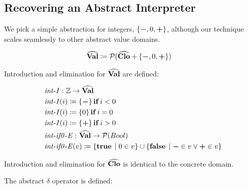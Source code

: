 \subsection{Recovering an Abstract
Interpreter}\label{recovering-an-abstract-interpreter}

\par

We pick a simple abstraction for integers,
$ \{  \mathbin{\mathtt{\mathbf{\boldsymbol{-}}}} ,0, \mathbin{\mathtt{\mathbf{\boldsymbol{+}}}}  \} $, although our technique
scales seamlessly to other abstract value domains.

\small\begin{align*}
&\hspace{0em}  \widehat{\mathtt{\mathbf{Val}}}   \coloneqq   \mathcal{P}  (\widehat{\mathtt{\mathbf{Clo}}}  +  \{  \mathbin{\mathtt{\mathbf{\boldsymbol{-}}}} ,0, \mathbin{\mathtt{\mathbf{\boldsymbol{+}}}}  \} )
\end{align*}\normalsize

Introduction and elimination for $ \widehat{\mathtt{\mathbf{Val}}} $ are defined:

\small\begin{align*}
&\hspace{0em}  \operatorname{\mathit{int-I}}   \mathbin{\colon}   \mathbb{Z}   \rightarrow   \widehat{\mathtt{\mathbf{Val}}}  \\
&\hspace{0em}  \operatorname{\mathit{int-I}}( i)  \coloneqq   \{  \mathbin{\mathtt{\mathbf{\boldsymbol{-}}}}  \}   \operatorname{\mathtt{\boldsymbol{\mathbf{if}}}}  i < 0 \\
&\hspace{0em}  \operatorname{\mathit{int-I}}( i)  \coloneqq   \{ 0 \}     \operatorname{\mathtt{\boldsymbol{\mathbf{if}}}}  i = 0 \\
&\hspace{0em}  \operatorname{\mathit{int-I}}( i)  \coloneqq   \{  \mathbin{\mathtt{\mathbf{\boldsymbol{+}}}}  \}   \operatorname{\mathtt{\boldsymbol{\mathbf{if}}}}  i > 0 \\
&\hspace{0em}  \operatorname{\mathit{int-if0-E}}   \mathbin{\colon}   \widehat{\mathtt{\mathbf{Val}}}   \rightarrow   \mathcal{P} (Bool) \\
&\hspace{0em}  \operatorname{\mathit{int-if0-E}}( v)  \coloneqq   \{   \operatorname{\mathtt{\boldsymbol{\mathbf{true}}}}   \;|\;  0  \in  v  \}   \cup   \{   \operatorname{\mathtt{\boldsymbol{\mathbf{false}}}}   \;|\;   \mathbin{\mathtt{\mathbf{\boldsymbol{-}}}}   \in  v  \vee   \mathbin{\mathtt{\mathbf{\boldsymbol{+}}}}   \in  v  \} 
\end{align*}\normalsize

Introduction and elimination for $ \widehat{\mathtt{\mathbf{Clo}}} $ is identical to
the concrete domain.

\par

The abstract $ \delta $ operator is defined:

